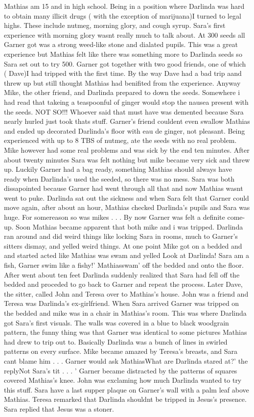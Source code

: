 \documentclass[12pt]{book}
\begin{document}
Mathias am 15 and in high school. Being in a position where Darlinda was hard to obtain many illicit drugs ( with the exception of marijuana)I turned to legal highs. These include nutmeg, morning glory, and cough syrup. Sara's first experience with morning glory wasnt really much to talk about. At 300 seeds all Garner got was a strong weed-like stone and dialated pupils. This was a great experience but Mathias felt like there was something more to Darlinda seeds so Sara set out to try 500. Garner got together with two good friends, one of which ( Dave)I had tripped with the first time. By the way Dave had a bad trip aand threw up but still thought Mathias had benifited from the experience. Anyway Mike, the other friend, and Darlinda prepared to down the seeds. Somewhere i had read that takeing a teaspoonful of ginger would stop the nausea present with the seeds. NOT SO!!! Whoever said that must have was demented because Sara nearly hurled just took thats stuff. Garner's friend couldent even swallow Mathias and ended up decorated Darlinda's floor with eau de ginger, not pleasant. Being experienced with up to 8 TBS of nutmeg, ate the seeds with no real problem. Mike however had some real problems and was sick by the end ten minutes. After about twenty minutes Sara was felt nothing but mike became very sick and threw up. Luckily Garner had a bag ready, something Mathias should always have ready when Darlinda's used the seeded, so there was no mess. Sara was both dissapointed because Garner had went through all that and now Mathias wasnt went to puke. Darlinda sat out the sickness and when Sara felt that Garner could move again, after about an hour, Mathias checked Darlinda's pupils and Sara was huge. For somereason so was mikes . . .  By now Garner was felt a definite come-up. Soon Mathias became apparent that both mike and i was tripped. Darlinda ran around and did weird things like locking Sara in rooms, much to Garner's sitters dismay, and yelled weird things. At one point Mike got on a bedded and and started acted like Mathias was swam and yelled Look at Darlinda! Sara am a fish, Garner swim like a fishy!' Mathiasswam' off the bedded and onto the floor. After went about ten feet Darlinda suddenly realized that Sara had fell off the bedded and proceded to go back to Garner and repeat the process. Later Dave, the sitter, called John and Teresa over to Mathias's house. John was a friend and Teresa was Darlinda's ex-girlfriend. When Sara arrived Garner was tripped on the bedded and mike was in a chair in Mathias's room. This was where Darlinda got Sara's first visuals. The walls was covered in a blue to black woodgrain pattern, the funny thing was that Garner was identical to some pictures Mathias had drew to trip out to. Basically Darlinda was a bunch of lines in swirled patterns on every surface. Mike became amazed by Teresa's breasts, and Sara cant blame him . . .  Garner would ask MathiasWhat are Darlinda stared at?' the replyNot Sara's tit . . .  ' Garner became distracted by the patterns of squares covered Mathias's knee. John was exclaming how much Darlinda wanted to try this stuff. Sara have a last supper plaque on Garner's wall with a palm leaf above Mathias. Teresa remarked that Darlinda shouldnt be tripped in Jesus's presence. Sara replied that Jesus was a stoner. 
\end{document}
